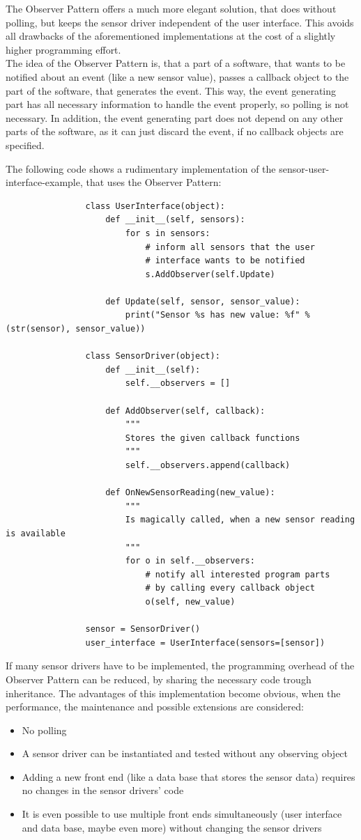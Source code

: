 			The Observer Pattern offers a much more elegant solution, that does without polling, but keeps the sensor driver independent of the user interface.
			This avoids all drawbacks of the aforementioned implementations at the cost of a slightly higher programming effort.\\
			The idea of the Observer Pattern is, that a part of a software, that wants to be notified about an event (like a new sensor value), passes a callback object to the part of the software, that generates the event.
			This way, the event generating part has all necessary information to handle the event properly, so polling is not necessary.
			In addition, the event generating part does not depend on any other parts of the software, as it can just discard the event, if no callback objects are specified.

			The following code shows a rudimentary implementation of the sensor-user-interface-example, that uses the Observer Pattern:
			\begin{verbatim}
				class UserInterface(object):
					def __init__(self, sensors):
						for s in sensors:
							# inform all sensors that the user
							# interface wants to be notified
							s.AddObserver(self.Update)

					def Update(self, sensor, sensor_value):
						print("Sensor %s has new value: %f" % (str(sensor), sensor_value))

				class SensorDriver(object):
					def __init__(self):
						self.__observers = []
				
					def AddObserver(self, callback):
						"""
						Stores the given callback functions
						"""
						self.__observers.append(callback)

					def OnNewSensorReading(new_value):
						"""
						Is magically called, when a new sensor reading is available
						"""
						for o in self.__observers:
							# notify all interested program parts
							# by calling every callback object
							o(self, new_value)

				sensor = SensorDriver()
				user_interface = UserInterface(sensors=[sensor])
			\end{verbatim}
			If many sensor drivers have to be implemented, the programming overhead of the Observer Pattern can be reduced, by sharing the necessary code trough inheritance.
			The advantages of this implementation become obvious, when the performance, the maintenance and possible extensions are considered:
			\begin{itemize}
				\item No polling
				\item A sensor driver can be instantiated and tested without any observing object
				\item Adding a new front end (like a data base that stores the sensor data) requires no changes in the sensor drivers' code
				\item It is even possible to use multiple front ends simultaneously (user interface and data base, maybe even more) without changing the sensor drivers
			\end{itemize}


